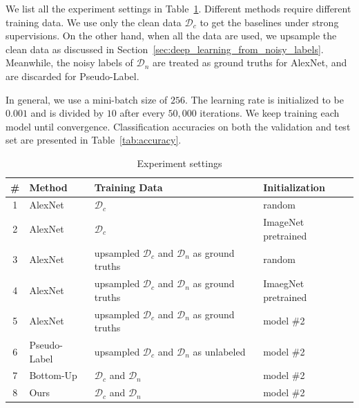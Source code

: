 \documentclass[10pt,twocolumn,letterpaper]{article}
\begin{document}
We list all the experiment settings in Table~\ref{tab:models}. Different methods require different training data. We use only the clean data $\mathcal{D}_c$ to get the baselines under strong supervisions. On the other hand, when all the data are used, we upsample the clean data as discussed in Section~\ref{sec:deep_learning_from_noisy_labels}. Meanwhile, the noisy labels of $\mathcal{D}_n$ are treated as ground truths for AlexNet, and are discarded for Pseudo-Label.

In general, we use a mini-batch size of $256$. The learning rate is initialized to be $0.001$ and is divided by $10$ after every $50,000$ iterations. We keep training each model until convergence. Classification accuracies on both the validation and test set are presented in Table~\ref{tab:accuracy}.

\begin{table}
\begin{center}
\begin{tabular}{c|p{3.5em}|p{9em}|p{5em}}
\hline
\# & Method & Training Data & Initialization \\
\hline\hline
1 & AlexNet & $\mathcal{D}_c$ & random \\
\hline
2 & AlexNet & $\mathcal{D}_c$ & ImageNet pretrained \\
\hline
3 & AlexNet & upsampled $\mathcal{D}_c$ and $\mathcal{D}_n$ as ground truths & random \\
\hline
4 & AlexNet & upsampled $\mathcal{D}_c$ and $\mathcal{D}_n$ as ground truths & ImaegNet pretrained \\
\hline
5 & AlexNet & upsampled $\mathcal{D}_c$ and $\mathcal{D}_n$ as ground truths & model \#2 \\
\hline
6 & Pseudo-Label\cite{lee2013pseudo} & upsampled $\mathcal{D}_c$ and $\mathcal{D}_n$ as unlabeled & model \#2 \\
\hline
7 & Bottom-Up~\cite{sukhbaatar2014learning} & $\mathcal{D}_c$ and $\mathcal{D}_n$ & model \#2 \\
\hline
8 & Ours & $\mathcal{D}_c$ and $\mathcal{D}_n$ & model \#2 \\
\hline
\end{tabular}
\end{center}
\caption{Experiment settings}
\label{tab:models}
\end{table}
\end{document}
